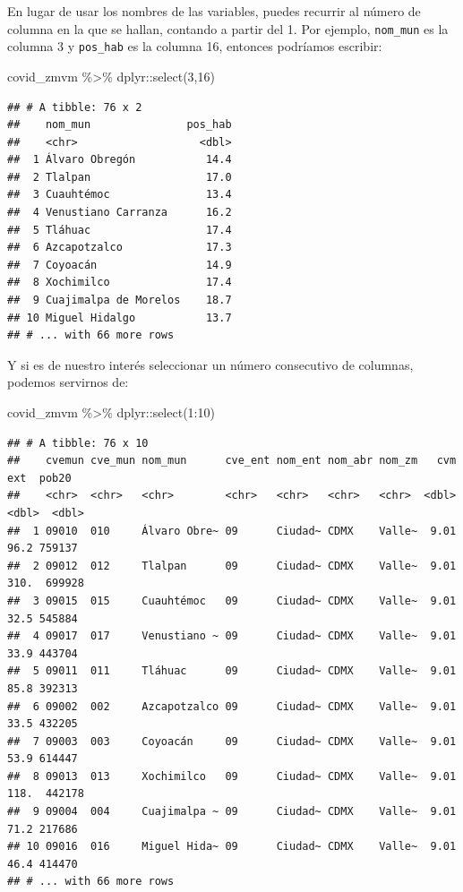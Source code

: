 \documentclass[
  11pt,
  oneside]{book}
\newenvironment{Shaded}{\begin{snugshade}}{\end{snugshade}}
\newcommand{\DecValTok}[1]{\textcolor[rgb]{0.00,0.00,0.81}{#1}}
\newcommand{\FunctionTok}[1]{\textcolor[rgb]{0.00,0.00,0.00}{#1}}
\newcommand{\NormalTok}[1]{#1}
\newcommand{\SpecialCharTok}[1]{\textcolor[rgb]{0.00,0.00,0.00}{#1}}
\begin{document}
En lugar de usar los nombres de las variables, puedes recurrir al número de columna en la que se hallan, contando a partir del 1. Por ejemplo, \texttt{nom\_mun} es la columna 3 y \texttt{pos\_hab} es la columna 16, entonces podríamos escribir:

\begin{Shaded}
\begin{Highlighting}[]
\NormalTok{covid\_zmvm }\SpecialCharTok{\%\textgreater{}\%}\NormalTok{ dplyr}\SpecialCharTok{::}\FunctionTok{select}\NormalTok{(}\DecValTok{3}\NormalTok{,}\DecValTok{16}\NormalTok{)}
\end{Highlighting}
\end{Shaded}

\begin{verbatim}
## # A tibble: 76 x 2
##    nom_mun               pos_hab
##    <chr>                   <dbl>
##  1 Álvaro Obregón           14.4
##  2 Tlalpan                  17.0
##  3 Cuauhtémoc               13.4
##  4 Venustiano Carranza      16.2
##  5 Tláhuac                  17.4
##  6 Azcapotzalco             17.3
##  7 Coyoacán                 14.9
##  8 Xochimilco               17.4
##  9 Cuajimalpa de Morelos    18.7
## 10 Miguel Hidalgo           13.7
## # ... with 66 more rows
\end{verbatim}

Y si es de nuestro interés seleccionar un número consecutivo de columnas, podemos servirnos de:

\begin{Shaded}
\begin{Highlighting}[]
\NormalTok{covid\_zmvm }\SpecialCharTok{\%\textgreater{}\%}\NormalTok{ dplyr}\SpecialCharTok{::}\FunctionTok{select}\NormalTok{(}\DecValTok{1}\SpecialCharTok{:}\DecValTok{10}\NormalTok{)}
\end{Highlighting}
\end{Shaded}

\begin{verbatim}
## # A tibble: 76 x 10
##    cvemun cve_mun nom_mun      cve_ent nom_ent nom_abr nom_zm   cvm   ext  pob20
##    <chr>  <chr>   <chr>        <chr>   <chr>   <chr>   <chr>  <dbl> <dbl>  <dbl>
##  1 09010  010     Álvaro Obre~ 09      Ciudad~ CDMX    Valle~  9.01  96.2 759137
##  2 09012  012     Tlalpan      09      Ciudad~ CDMX    Valle~  9.01 310.  699928
##  3 09015  015     Cuauhtémoc   09      Ciudad~ CDMX    Valle~  9.01  32.5 545884
##  4 09017  017     Venustiano ~ 09      Ciudad~ CDMX    Valle~  9.01  33.9 443704
##  5 09011  011     Tláhuac      09      Ciudad~ CDMX    Valle~  9.01  85.8 392313
##  6 09002  002     Azcapotzalco 09      Ciudad~ CDMX    Valle~  9.01  33.5 432205
##  7 09003  003     Coyoacán     09      Ciudad~ CDMX    Valle~  9.01  53.9 614447
##  8 09013  013     Xochimilco   09      Ciudad~ CDMX    Valle~  9.01 118.  442178
##  9 09004  004     Cuajimalpa ~ 09      Ciudad~ CDMX    Valle~  9.01  71.2 217686
## 10 09016  016     Miguel Hida~ 09      Ciudad~ CDMX    Valle~  9.01  46.4 414470
## # ... with 66 more rows
\end{verbatim}
\end{document}
